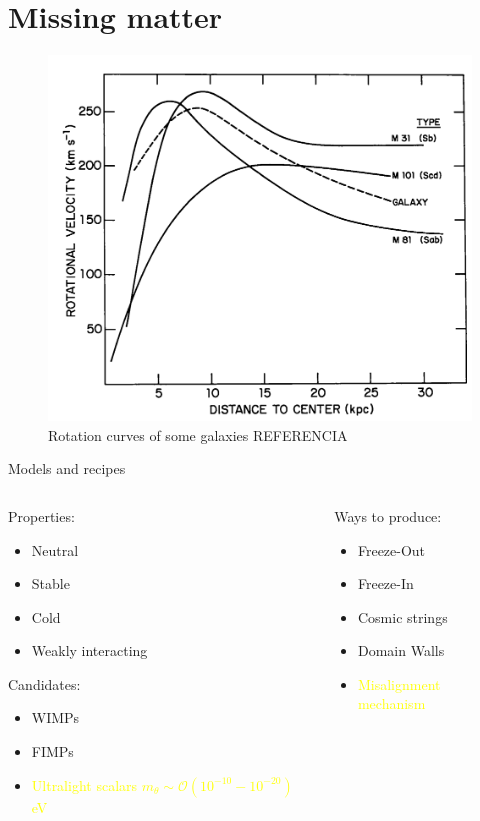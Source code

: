 \section{Missing matter}

\begin{frame}
    
    \begin{figure}
         \centering
         \includegraphics[width=.7\textwidth]{Figures/rotation-curves.png}
        \caption{Rotation curves of some galaxies REFERENCIA}
        \label{fig:rot}
    \end{figure}
    
\end{frame}

\begin{frame}{Models and recipes}
\begin{columns}
\begin{column}{0.5\textwidth}
Properties:
    \begin{itemize}
        \item Neutral
        \item Stable
        \item Cold
        \item Weakly interacting
    \end{itemize}
    \bigskip
Candidates:
    \begin{itemize}
        \item WIMPs
        \item FIMPs
        \item \textcolor{yellow}{Ultralight scalars}
        \textcolor{yellow}{$m_\theta \sim \mathcal{O}(10^{-10}-10^{-20})$ \si{\eV}}
    \end{itemize}
\end{column}
\begin{column}{0.5\textwidth}
Ways to produce:
\begin{itemize}
    \item Freeze-Out
    \item Freeze-In
    \item Cosmic strings
    \item Domain Walls
    \item \textcolor{yellow}{Misalignment mechanism}
\end{itemize}
\end{column}
\end{columns}
\end{frame}